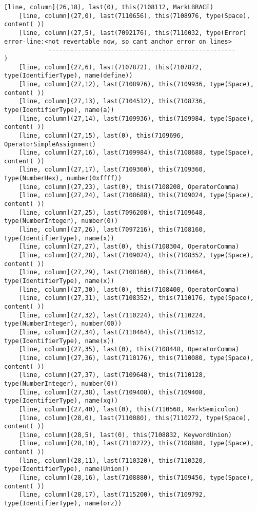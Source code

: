 \documentclass[UTF8]{ctexart}
\begin{document}
{\begin{lstlisting}[language={[ANSI]C++}]
    [line, column](26,18), last(0), this(7108112, MarkLBRACE)
    [line, column](27,0), last(7110656), this(7108976, type(Space), content( ))
    [line, column](27,5), last(7092176), this(7110032, type(Error)
error-line:<not revertable now, so cant anchor error on lines>
            ---------------------------------------------------
)
    [line, column](27,6), last(7107872), this(7107872, type(IdentifierType), name(define))
    [line, column](27,12), last(7108976), this(7109936, type(Space), content( ))
    [line, column](27,13), last(7104512), this(7108736, type(IdentifierType), name(a))
    [line, column](27,14), last(7109936), this(7109984, type(Space), content( ))
    [line, column](27,15), last(0), this(7109696, OperatorSimpleAssignment)
    [line, column](27,16), last(7109984), this(7108688, type(Space), content( ))
    [line, column](27,17), last(7109360), this(7109360, type(NumberHex), number(0xffff))
    [line, column](27,23), last(0), this(7108208, OperatorComma)
    [line, column](27,24), last(7108688), this(7109024, type(Space), content( ))
    [line, column](27,25), last(7096208), this(7109648, type(NumberInteger), number(0))
    [line, column](27,26), last(7097216), this(7108160, type(IdentifierType), name(x))
    [line, column](27,27), last(0), this(7108304, OperatorComma)
    [line, column](27,28), last(7109024), this(7108352, type(Space), content( ))
    [line, column](27,29), last(7108160), this(7110464, type(IdentifierType), name(x))
    [line, column](27,30), last(0), this(7108400, OperatorComma)
    [line, column](27,31), last(7108352), this(7110176, type(Space), content( ))
    [line, column](27,32), last(7110224), this(7110224, type(NumberInteger), number(00))
    [line, column](27,34), last(7110464), this(7110512, type(IdentifierType), name(x))
    [line, column](27,35), last(0), this(7108448, OperatorComma)
    [line, column](27,36), last(7110176), this(7110080, type(Space), content( ))
    [line, column](27,37), last(7109648), this(7110128, type(NumberInteger), number(0))
    [line, column](27,38), last(7109408), this(7109408, type(IdentifierType), name(xg))
    [line, column](27,40), last(0), this(7110560, MarkSemicolon)
    [line, column](28,0), last(7110080), this(7110272, type(Space), content( ))
    [line, column](28,5), last(0), this(7108832, KeywordUnion)
    [line, column](28,10), last(7110272), this(7108880, type(Space), content( ))
    [line, column](28,11), last(7110320), this(7110320, type(IdentifierType), name(Union))
    [line, column](28,16), last(7108880), this(7109456, type(Space), content( ))
    [line, column](28,17), last(7115200), this(7109792, type(IdentifierType), name(orz))

\end{lstlisting}}
\end{document}
